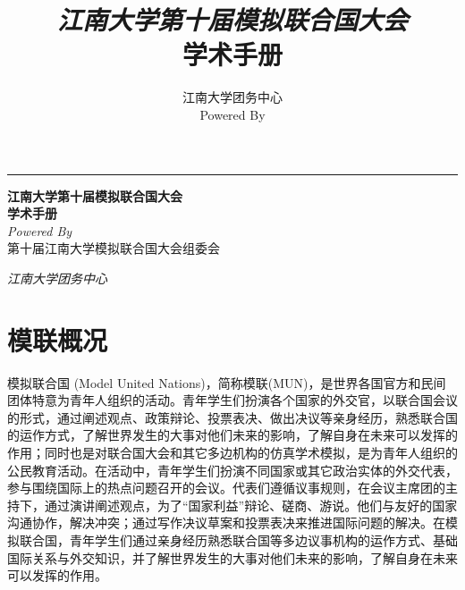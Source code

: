 \documentclass[a4paper,openany]{book}
\title{\huge \textit{江南大学第十届模拟联合国大会} \\ \Huge \textbf{学术手册}}
\author{江南大学团务中心  \\  \small Powered By \XeLaTeX}
\begin{document}

\begin{titlepage} %
	
	\raggedleft %
	
	\rule{1pt}{\textheight} %
	\hspace{0.05\textwidth} %
	\parbox[b]{0.75\textwidth}{ %
		
		{\large\bfseries 江南大学第十届模拟联合国大会 \\[1\baselineskip] \Huge 学术手册}\\[2\baselineskip] %
		{\large\textit{Powered By \XeLaTeX}}\\[4\baselineskip] %
		{\large{第十届江南大学模拟联合国大会组委会}} %
		
		\vspace{0.5\textheight} %
		
		{\noindent \textit{江南大学团务中心}}\\[\baselineskip] 
	}

\end{titlepage}

\thispagestyle{empty}

\frontmatter
\thispagestyle{empty}
\tableofcontents

\mainmatter

\chapter{模联概况}

模拟联合国 (Model United Nations)，简称模联(MUN)，是世界各国官方和民间团体特意为青年人组织的活动。青年学生们扮演各个国家的外交官，以联合国会议的形式，通过阐述观点、政策辩论、投票表决、做出决议等亲身经历，熟悉联合国的运作方式，了解世界发生的大事对他们未来的影响，了解自身在未来可以发挥的作用；同时也是对联合国大会和其它多边机构的仿真学术模拟，是为青年人组织的公民教育活动。在活动中，青年学生们扮演不同国家或其它政治实体的外交代表，参与围绕国际上的热点问题召开的会议。代表们遵循议事规则，在会议主席团的主持下，通过演讲阐述观点，为了“国家利益”辩论、磋商、游说。他们与友好的国家沟通协作，解决冲突；通过写作决议草案和投票表决来推进国际问题的解决。在模拟联合国，青年学生们通过亲身经历熟悉联合国等多边议事机构的运作方式、基础国际关系与外交知识，并了解世界发生的大事对他们未来的影响，了解自身在未来可以发挥的作用。
\end{document}
